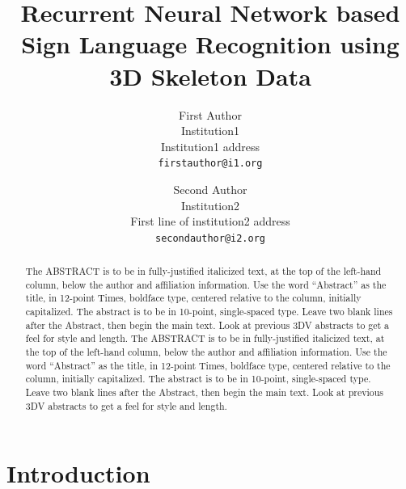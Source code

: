 \documentclass[10pt,twocolumn,letterpaper]{article}
\begin{document}
\title{Recurrent Neural Network based Sign Language Recognition using 3D Skeleton Data}

\author{First Author\\
Institution1\\
Institution1 address\\
{\tt\small firstauthor@i1.org}
\and
Second Author\\
Institution2\\
First line of institution2 address\\
{\tt\small secondauthor@i2.org}
}

\maketitle

\begin{abstract}
   The ABSTRACT is to be in fully-justified italicized text, at the top
   of the left-hand column, below the author and affiliation
   information. Use the word ``Abstract'' as the title, in 12-point
   Times, boldface type, centered relative to the column, initially
   capitalized. The abstract is to be in 10-point, single-spaced type.
   Leave two blank lines after the Abstract, then begin the main text.
   Look at previous 3DV abstracts to get a feel for style and length. The ABSTRACT is to be in fully-justified italicized text, at the top
   of the left-hand column, below the author and affiliation
   information. Use the word ``Abstract'' as the title, in 12-point
   Times, boldface type, centered relative to the column, initially
   capitalized. The abstract is to be in 10-point, single-spaced type.
   Leave two blank lines after the Abstract, then begin the main text.
   Look at previous 3DV abstracts to get a feel for style and length.
\end{abstract}

\section{Introduction}
\end{document}
